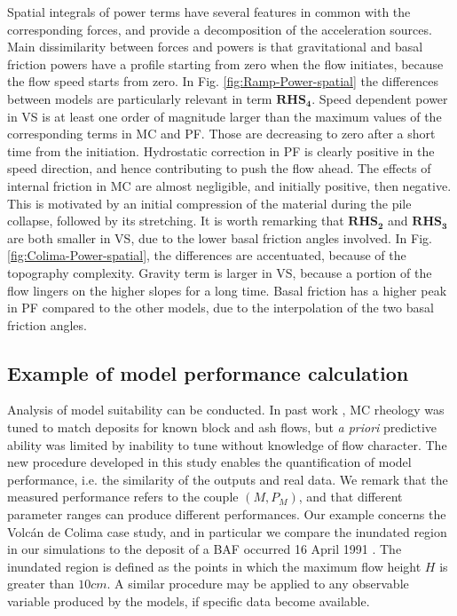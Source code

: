 \documentclass{article}
\begin{document}
Spatial integrals of power terms have several features in common with the corresponding forces, and provide a decomposition of the acceleration sources. Main dissimilarity between forces and powers is that gravitational and basal friction powers have a profile starting from zero when the flow initiates, because the flow speed starts from zero. In Fig. \ref{fig:Ramp-Power-spatial} the differences between models are particularly relevant in term  $\boldsymbol{RHS_4}$. Speed dependent power in VS is at least one order of magnitude larger than the maximum values of the corresponding terms in MC and PF. Those are decreasing to zero after a short time from the initiation. Hydrostatic correction in PF is clearly positive in the speed direction, and hence contributing to push the flow ahead. The effects of internal friction in MC are almost negligible, and initially positive, then negative. This is motivated by an initial compression of the material during the pile collapse, followed by its stretching. It is worth remarking that $\boldsymbol{RHS_2}$ and $\boldsymbol{RHS_3}$ are both smaller in VS, due to the lower basal friction angles involved. In Fig. \ref{fig:Colima-Power-spatial}, the differences are accentuated, because of the topography complexity. Gravity term is larger in VS, because a portion of the flow lingers on the higher slopes for a long time. Basal friction has a higher peak in PF compared to the other models, due to the interpolation of the two basal friction angles.

\subsection{Example of model performance calculation}
Analysis of model suitability can be conducted. In past work \cite{Patra2005}, MC rheology was tuned to match deposits for known block and ash flows, but {\it a priori} predictive ability was limited by inability to tune without knowledge of flow character. The new procedure developed in this study enables the quantification of model performance, i.e. the similarity of the outputs and real data. We remark that the measured performance refers to the couple $\left(M, P_M\right)$, and that different parameter ranges can produce different performances. Our example concerns the Volc{\'a}n de Colima case study, and in particular we compare the inundated region in our simulations to the deposit of a BAF occurred 16 April 1991 \citep{Saucedo2004, Rupp2004, Rupp2006}. The inundated region is defined as the points in which the maximum flow height $H$ is greater than $10 cm$. A similar procedure may be applied to any observable variable produced by the models, if specific data become available.
\end{document}
